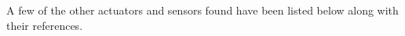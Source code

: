 \documentclass[11pt,a4paper]{article}
\begin{document}


\newpage
\begingroup
\hypersetup{linkcolor=black}
\tableofcontents
\listoffigures
\endgroup

\newpage






A few of the other actuators and sensors found have been listed below along with their references. 




\newpage

% 
\end{document}
